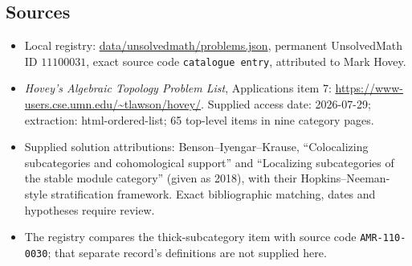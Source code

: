 \documentclass[11pt]{article}
\begin{document}
\subsection{Sources}
\begin{itemize}
\item Local registry: \url{data/unsolvedmath/problems.json}, permanent UnsolvedMath ID $11100031$, exact source code \texttt{catalogue entry}, attributed to Mark Hovey.
\item \emph{Hovey's Algebraic Topology Problem List}, Applications item 7: \url{https://www-users.cse.umn.edu/~tlawson/hovey/}. Supplied access date: 2026-07-29; extraction: html-ordered-list; 65 top-level items in nine category pages.
\item Supplied solution attributions: Benson--Iyengar--Krause, ``Colocalizing subcategories and cohomological support'' and ``Localizing subcategories of the stable module category'' (given as 2018), with their Hopkins--Neeman-style stratification framework. Exact bibliographic matching, dates and hypotheses require review.
\item The registry compares the thick-subcategory item with source code \texttt{AMR-110-0030}; that separate record's definitions are not supplied here.
\end{itemize}
\end{document}
